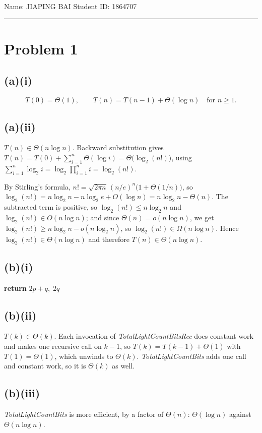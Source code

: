 \documentclass[11pt,a4paper]{article}
\newcommand{\Oh}{\ensuremath{O}}
\begin{document}
\begin{center}
Name: JIAPING BAI \qquad Student ID: 1864707
\end{center}
\vspace{-0.4em}
\hrule
\vspace{0.6em}
\section*{Problem 1}
\subsection*{(a)(i)}
\[
T(0)=\Theta(1),
\qquad
T(n)=T(n-1)+\Theta(\log n) \quad\text{for } n\ge 1 .
\]
\subsection*{(a)(ii)}
$T(n)\in\Theta(n\log n)$. Backward substitution gives
$T(n)=T(0)+\sum_{i=1}^{n}\Theta(\log i)=\Theta\bigl(\log_2(n!)\bigr)$, using
$\sum_{i=1}^{n}\log_2 i=\log_2\prod_{i=1}^{n} i=\log_2(n!)$.

By Stirling's formula, $n!=\sqrt{2\pi n}\,(n/e)^{n}\bigl(1+\Theta(1/n)\bigr)$, so
$\log_2(n!)=n\log_2 n-n\log_2 e+\Oh(\log n)=n\log_2 n-\Theta(n)$.
The subtracted term is positive, so $\log_2(n!)\le n\log_2 n$ and $\log_2(n!)\in\Oh(n\log n)$; and
since $\Theta(n)=o(n\log n)$, we get $\log_2(n!)\ge n\log_2 n-o(n\log_2 n)$, so
$\log_2(n!)\in\Omega(n\log n)$. Hence $\log_2(n!)\in\Theta(n\log n)$ and therefore
$T(n)\in\Theta(n\log n)$.
\subsection*{(b)(i)}
\textbf{return } $2p+q,\;2q$
\subsection*{(b)(ii)}
$T(k)\in\Theta(k)$. Each invocation of \textit{TotalLightCountBitsRec} does constant work and makes
one recursive call on $k-1$, so $T(k)=T(k-1)+\Theta(1)$ with $T(1)=\Theta(1)$, which unwinds to
$\Theta(k)$. \textit{TotalLightCountBits} adds one call and constant work, so it is $\Theta(k)$ as
well.
\subsection*{(b)(iii)}
\textit{TotalLightCountBits} is more efficient, by a factor of $\Theta(n)$: $\Theta(\log n)$
against $\Theta(n\log n)$.
\end{document}
